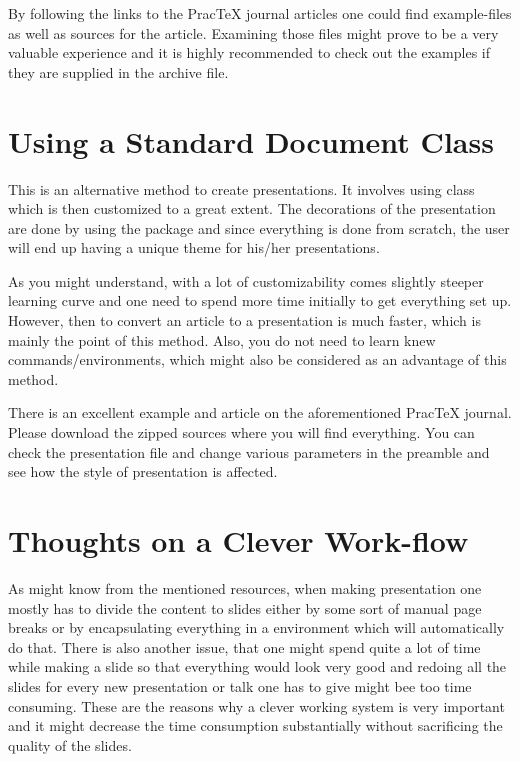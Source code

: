 \documentclass[
    draft
]{scrartcl}
\begin{document}
%
By following the links to the Prac\TeX{} journal articles one could find
    example-files as well as sources for the article.
%
Examining those files might prove to be a very valuable experience and it is
    highly recommended to check out the examples if they are supplied in the
    archive file.

\section{Using a Standard Document Class}

%
This is an alternative method to create presentations.
%
It involves using  class which is then customized to a great
    extent.
%
The decorations of the presentation are done by using the  package and
    since everything is done from scratch, the user will end up having a unique
    theme for his/her presentations.

%
As you might understand, with a lot of customizability comes slightly steeper
    learning curve and one need to spend more time initially to get everything
    set up.
%
However, then to convert an article to a presentation is much faster, which is
    mainly the point of this method.
%
Also, you do not need to learn knew commands/environments, which might also be
    considered as an advantage of this method.

%
There is an excellent example and article on the aforementioned
    PracTeX{} journal\cite{PracTeX-komapres}.
%
Please download the zipped sources where you will find everything.
%
You can check the presentation  file and change various parameters in
    the preamble and see how the style of presentation is affected.

\section{Thoughts on a Clever Work-flow}

%
As might know from the mentioned resources, when making presentation one mostly
    has to divide the content to slides either by some sort of manual page
    breaks or by encapsulating everything in a  environment which
    will automatically do that.
%
There is also another issue, that one might spend quite a lot of time while
    making a slide so that everything would look very good and redoing all the
    slides for every new presentation or talk one has to give might bee too time
    consuming.
%
These are the reasons why a clever working system is very important and it might
    decrease the time consumption substantially without sacrificing the quality
    of the slides.
\end{document}
